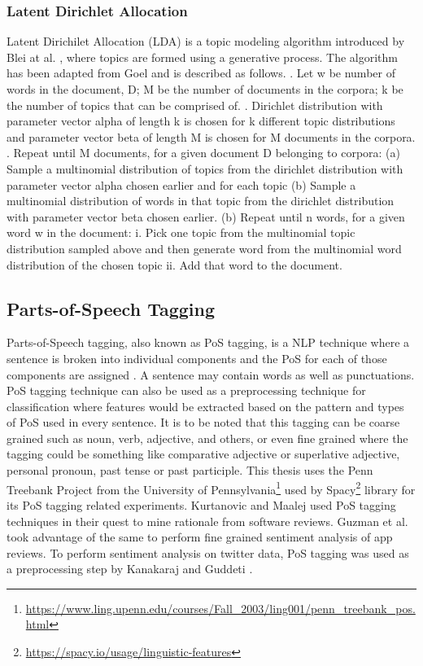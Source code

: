 \documentclass[a4paper,12pt,twoside]{report}
\begin{document}
\subsubsection{Latent Dirichlet Allocation}
Latent Dirichilet Allocation (LDA) is a topic modeling algorithm introduced by Blei at al. \cite{Blei2003}, where topics are formed using a generative process. The algorithm has been adapted from Goel \cite{Goel2017} and is described as follows.
. Let w be number of words in the document, D; M be the number of documents in the corpora; k be the number of topics that can be comprised of. 
. Dirichlet distribution with parameter vector alpha of length k is chosen for k different topic distributions and parameter vector beta of length M is chosen for M documents in the corpora.
. Repeat until M documents, for a given document D belonging to corpora:
\bigbreak
(a) Sample a multinomial distribution of topics from the dirichlet distribution with parameter vector alpha chosen earlier and for each topic
\bigbreak
(b) Sample a multinomial distribution of words in that topic from the dirichlet distribution with parameter vector beta chosen earlier.
\bigbreak
(b) Repeat until n words, for a given word w in the document:
\bigbreak
i. Pick one topic from the multinomial topic distribution sampled above and then generate word from the multinomial word distribution of the chosen topic 
\bigbreak
ii. Add that word to the document.

\subsection{Parts-of-Speech Tagging}
Parts-of-Speech tagging, also known as PoS tagging, is a NLP technique where a sentence is broken into individual components and the PoS for each of those components are assigned \cite{Jurafsky2017}. A sentence may contain words as well as punctuations. PoS tagging technique can also be used as a preprocessing technique for classification where features would be extracted based on the pattern and types of PoS used in every sentence. It is to be noted that this tagging can be coarse grained such as noun, verb, adjective, and others, or even fine grained where the tagging could be something like comparative adjective or superlative adjective, personal pronoun, past tense or past participle. This thesis uses the Penn Treebank Project from the University of Pennsylvania\footnote{\url{https://www.ling.upenn.edu/courses/Fall_2003/ling001/penn_treebank_pos.html}} used by Spacy\footnote{\url{https://spacy.io/usage/linguistic-features}} library for its PoS tagging related experiments.
\newline \newline
Kurtanovic and Maalej \cite{Kurtanovic2017} used PoS tagging techniques in their quest to mine rationale from software reviews. Guzman et al.\cite{Guzman2015} took advantage of the same to perform fine grained sentiment analysis of app reviews. To perform sentiment analysis on twitter data, PoS tagging was used as a preprocessing step by Kanakaraj and Guddeti \cite{Kanakaraj2015}.
\end{document}
